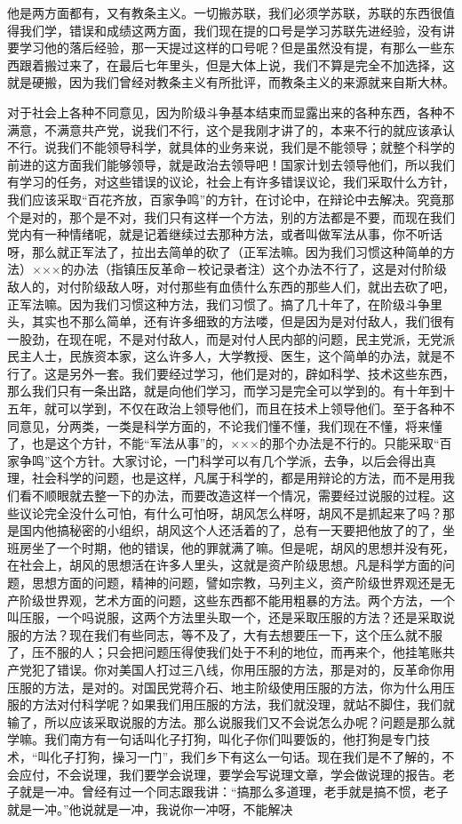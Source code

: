 他是两方面都有，又有教条主义。一切搬苏联，我们必须学苏联，苏联的东西很值得我们学，错误和成绩这两方面，我们现在提的口号是学习苏联先进经验，没有讲要学习他的落后经验，那一天提过这样的口号呢？但是虽然没有提，有那么一些东西跟着搬过来了，在最后七年里头，但是大体上说，我们不算是完全不加选择，这就是硬搬，因为我们曾经对教条主义有所批评，而教条主义的来源就来自斯大林。

对于社会上各种不同意见，因为阶级斗争基本结束而显露出来的各种东西，各种不满意，不满意共产党，说我们不行，这个是我刚才讲了的，本来不行的就应该承认不行。说我们不能领导科学，就具体的业务来说，我们是不能领导；就整个科学的前进的这方面我们能够领导，就是政治去领导吧！国家计划去领导他们，所以我们有学习的任务，对这些错误的议论，社会上有许多错误议论，我们采取什么方针，我们应该采取“百花齐放，百家争鸣”的方针，在讨论中，在辩论中去解决。究竟那个是对的，那个是不对，我们只有这样一个方法，别的方法都是不要，而现在我们党内有一种情绪呢，就是记着继续过去那种方法，或者叫做军法从事，你不听话呀，那么就正军法了，拉出去简单的砍了（正军法嘛。因为我们习惯这种简单的方法）×××的办法（指镇压反革命－校记录者注）这个办法不行了，这是对付阶级敌人的，对付阶级敌人呀，对付那些有血债什么东西的那些人们，就出去砍了吧，正军法嘛。因为我们习惯这种方法，我们习惯了。搞了几十年了，在阶级斗争里头，其实也不那么简单，还有许多细致的方法喽，但是因为是对付敌人，我们很有一股劲，在现在呢，不是对付敌人，而是对付人民内部的问题，民主党派，无党派民主人士，民族资本家，这么许多人，大学教授、医生，这个简单的办法，就是不行了。这是另外一套。我们要经过学习，他们是对的，辟如科学、技术这些东西，那么我们只有一条出路，就是向他们学习，而学习是完全可以学到的。有十年到十五年，就可以学到，不仅在政治上领导他们，而且在技术上领导他们。至于各种不同意见，分两类，一类是科学方面的，不论我们懂不懂，我们现在不懂，将来懂了，也是这个方针，不能“军法从事”的，×××的那个办法是不行的。只能采取“百家争鸣”这个方针。大家讨论，一门科学可以有几个学派，去争，以后会得出真理，社会科学的问题，也是这样，凡属于科学的，都是用辩论的方法，而不是用我们看不顺眼就去整一下的办法，而要改造这样一个情况，需要经过说服的过程。这些议论完全没什么可怕，有什么可怕呀，胡风怎么样呀，胡风不是抓起来了吗？那是国内他搞秘密的小组织，胡风这个人还活着的了，总有一天要把他放了的了，坐班房坐了一个时期，他的错误，他的罪就满了嘛。但是呢，胡风的思想并没有死，在社会上，胡风的思想活在许多人里头，这就是资产阶级思想。凡是科学方面的问题，思想方面的问题，精神的问题，譬如宗教，马列主义，资产阶级世界观还是无产阶级世界观，艺术方面的问题，这些东西都不能用粗暴的方法。两个方法，一个叫压服，一个吗说服，这两个方法里头取一个，还是采取压服的方法？还是采取说服的方法？现在我们有些同志，等不及了，大有去想要压一下，这个压么就不服了，压不服的人；只会把问题压得使我们处于不利的地位，而再来个，他挂笔账共产党犯了错误。你对美国人打过三八线，你用压服的方法，那是对的，反革命你用压服的方法，是对的。对国民党蒋介石、地主阶级使用压服的方法，你为什么用压服的方法对付科学呢？如果我们用压服的方法，我们就没理，就站不脚住，我们就输了，所以应该采取说服的方法。那么说服我们又不会说怎么办呢？问题是那么就学嘛。我们南方有一句话叫化子打狗，叫化子你们叫要饭的，他打狗是专门技术，“叫化子打狗，操习一门”，我们乡下有这么一句话。现在我们是不了解的，不会应付，不会说理，我们要学会说理，要学会写说理文章，学会做说理的报告。老子就是一冲。曾经有过一个同志跟我讲：“搞那么多道理，老手就是搞不惯，老子就是一冲。”他说就是一冲，我说你一冲呀，不能解决